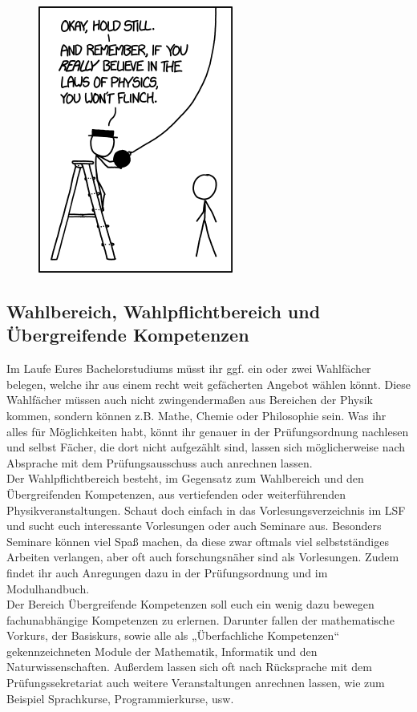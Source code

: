 \begin{figure}[b]
	\centering
	\includegraphics[width=.5\linewidth]{bilder/laws_of_physics.png}
\end{figure}

\subsection{Wahlbereich, Wahlpflichtbereich und Übergreifende Kompetenzen}

Im Laufe Eures Bachelorstudiums müsst ihr ggf. ein oder zwei Wahlfächer belegen, welche ihr aus einem recht weit gefächerten Angebot wählen könnt. Diese Wahlfächer müssen auch nicht zwingendermaßen aus Bereichen der Physik kommen, sondern können z.B. Mathe, Chemie oder Philosophie sein. Was ihr alles für Möglichkeiten habt, könnt ihr genauer in der Prüfungsordnung nachlesen und selbst Fächer, die dort nicht aufgezählt sind, lassen sich möglicherweise nach Absprache mit dem Prüfungsausschuss auch anrechnen lassen.\\

Der Wahlpflichtbereich besteht, im Gegensatz zum Wahlbereich und den Übergreifenden Kompetenzen, aus vertiefenden oder weiterführenden Physikveranstaltungen. Schaut doch einfach in das Vorlesungsverzeichnis im LSF und sucht euch interessante Vorlesungen oder auch Seminare aus. Besonders Seminare können viel Spaß machen, da diese zwar oftmals viel selbstständiges Arbeiten verlangen, aber oft auch forschungsnäher sind als Vorlesungen. Zudem findet ihr auch Anregungen dazu in der Prüfungsordnung und im Modulhandbuch.\\

Der Bereich Übergreifende Kompetenzen soll euch ein wenig dazu bewegen fachunabhängige Kompetenzen zu erlernen. Darunter fallen der mathematische Vorkurs, der Basiskurs, sowie alle als „Überfachliche Kompetenzen“ gekennzeichneten Module der Mathematik, Informatik und den Naturwissenschaften. Außerdem lassen sich oft nach Rücksprache mit dem Prüfungssekretariat auch weitere Veranstaltungen anrechnen lassen, wie zum Beispiel Sprachkurse, Programmierkurse, usw.\\

